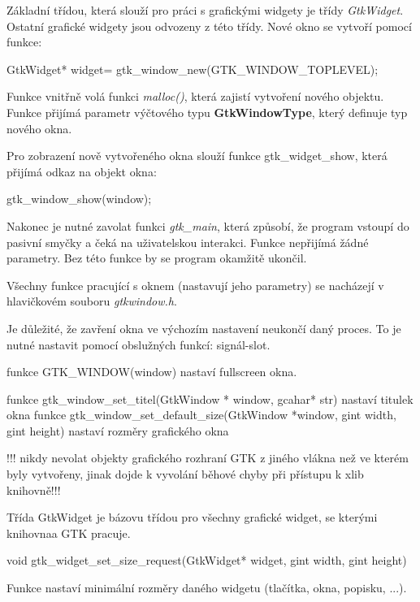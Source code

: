 Základní třídou, která slouží pro práci s grafickými widgety je třídy {\it GtkWidget}. Ostatní grafické widgety jsou odvozeny z této třídy. Nové okno se vytvoří pomocí funkce:

\vskip 4mm
{
\verbatim
\odradkovat

\odradkovat
\hskip 4mm GtkWidget* widget= gtk\_window\_new(GTK\_WINDOW\_TOPLEVEL);\odradkovat
}
\vskip 4mm

Funkce vnitřně volá funkci {\it malloc()}, která zajistí vytvoření nového objektu. Funkce přijímá parametr výčtového typu {\bf GtkWindowType}, který definuje typ nového okna.

Pro zobrazení nově vytvořeného okna slouží funkce gtk\_widget\_show, která přijímá odkaz na objekt okna:

\vskip 4mm
{
\verbatim
\odradkovat

\odradkovat
\hskip 4mm gtk\_window\_show(window);\odradkovat
}
\vskip 4mm

Nakonec je nutné zavolat funkci {\it gtk\_main}, která způsobí, že program vstoupí do pasivní smyčky a čeká na uživatelskou interakci. Funkce nepřijímá žádné parametry. Bez této funkce by se program okamžitě ukončil.

Všechny funkce pracující s oknem (nastavují jeho parametry) se nacházejí v hlavičkovém souboru {\it gtkwindow.h}.

Je důležité, že zavření okna ve výchozím nastavení neukončí daný proces. To je nutné nastavit pomocí obslužných funkcí: signál-slot.



funkce GTK\_WINDOW(window) nastaví fullscreen  okna.

funkce gtk\_window\_set\_titel(GtkWindow * window, gcahar* str) nastaví titulek okna
funkce gtk\_window\_set\_default\_size(GtkWindow *window, gint width, gint height) nastaví rozměry grafického okna

!!! nikdy nevolat objekty grafického rozhraní GTK z jiného vlákna než ve kterém byly vytvořeny, jinak dojde k vyvolání běhové chyby při přístupu k xlib knihovně!!!


Třída GtkWidget je bázovu třídou pro všechny grafické widget, se kterými knihovnaa GTK pracuje. 

\vskip 4mm
{\verbatim void  gtk\_widget\_set\_size\_request(GtkWidget* widget, gint width, gint height)}
\vskip 4mm

Funkce nastaví minimální rozměry daného widgetu (tlačítka, okna, popisku, ...).

